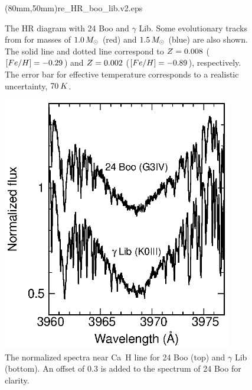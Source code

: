 \documentclass[]{pasj01}
\begin{document}
\begin{figure}
\begin{center}
\FigureFile(80mm,50mm){re_HR_boo_lib.v2.eps}
\end{center}
\caption{The HR diagram with 24 Boo and $\gamma$ Lib. 
Some evolutionary tracks from \citet{Bressan2012} for masses of $1.0\,M_{\Sol}$ (red) and $1.5\,M_{\Sol}$ (blue) are also shown. 
The solid line and dotted line correspond to ${\rm Z}=0.008$ (${\rm [Fe/H]} = -0.29$) and ${\rm Z}=0.002$ (${\rm [Fe/H]} = -0.89$), respectively.
The error bar for effective temperature corresponds to a realistic uncertainty, $70\>{\rm K}$.
} 
\label{re_HR}
\end{figure}

\begin{figure}
\begin{center}
\includegraphics[width=10cm]{re_cahk_boo_lib.eps}
\end{center}
\caption{The normalized spectra near Ca\, H line for 24 Boo (top) and $\gamma$ Lib (bottom). An offset of $0.3$ is added to the spectrum of 24 Boo for clarity.}
\label{re_cahk_127_138}
\end{figure}

\end{document}
